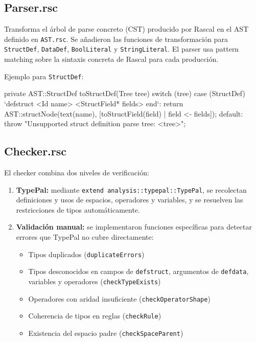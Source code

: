 \documentclass[12pt]{article}
\newcommand{\code}[1]{\texttt{#1}}
\begin{document}
\subsection{Parser.rsc}

Transforma el árbol de parse concreto (CST) producido por Rascal en el
AST definido en \code{AST.rsc}. Se añadieron las funciones de
transformación para \code{StructDef}, \code{DataDef}, \code{BoolLiteral}
y \code{StringLiteral}. El parser usa pattern matching sobre la sintaxis
concreta de Rascal para cada producción.

Ejemplo para \code{StructDef}:

\begin{rascal}
private AST::StructDef toStructDef(Tree tree) {
  switch (tree) {
    case (StructDef) `defstruct <Id name> <StructField* fields> end`:
      return AST::structNode(text(name),
               [toStructField(field) | field <- fields]);
    default:
      throw "Unsupported struct definition parse tree: <tree>";
  }
}
\end{rascal}

\subsection{Checker.rsc}

El checker combina dos niveles de verificación:

\begin{enumerate}
  \item \textbf{TypePal:} mediante \code{extend analysis::typepal::TypePal},
        se recolectan definiciones y usos de espacios, operadores y variables,
        y se resuelven las restricciones de tipos automáticamente.
  \item \textbf{Validación manual:} se implementaron funciones específicas
        para detectar errores que TypePal no cubre directamente:
        \begin{itemize}
          \item Tipos duplicados (\code{duplicateErrors})
          \item Tipos desconocidos en campos de \code{defstruct},
                argumentos de \code{defdata}, variables y operadores
                (\code{checkTypeExists})
          \item Operadores con aridad insuficiente (\code{checkOperatorShape})
          \item Coherencia de tipos en reglas (\code{checkRule})
          \item Existencia del espacio padre (\code{checkSpaceParent})
        \end{itemize}
\end{enumerate}
\end{document}
